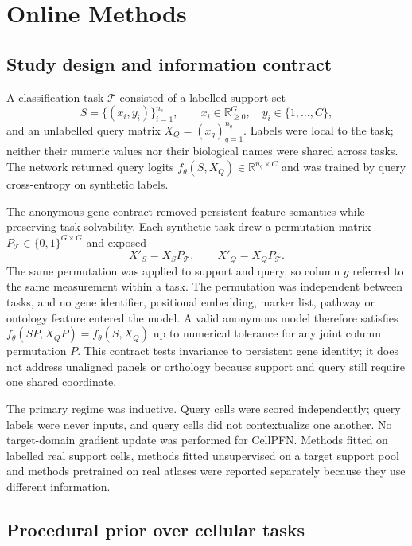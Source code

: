 \documentclass[12pt]{article}
\begin{document}
\section*{Online Methods}

\subsection*{Study design and information contract}

A classification task $\mathcal{T}$ consisted of a labelled support set
\begin{equation}
S=\{(x_i,y_i)\}_{i=1}^{n_s},\qquad x_i\in\mathbb{R}_{\geq0}^{G},\quad y_i\in\{1,\ldots,C\},
\end{equation}
and an unlabelled query matrix $X_Q=(x_q)_{q=1}^{n_q}$. Labels were local to the task; neither their numeric values nor their biological names were shared across tasks. The network returned query logits $f_\theta(S,X_Q)\in\mathbb{R}^{n_q\times C}$ and was trained by query cross-entropy on synthetic labels.

The anonymous-gene contract removed persistent feature semantics while preserving task solvability. Each synthetic task drew a permutation matrix $P_\mathcal{T}\in\{0,1\}^{G\times G}$ and exposed
\begin{equation}
X'_S=X_SP_\mathcal{T},\qquad X'_Q=X_QP_\mathcal{T}.
\end{equation}
The same permutation was applied to support and query, so column $g$ referred to the same measurement within a task. The permutation was independent between tasks, and no gene identifier, positional embedding, marker list, pathway or ontology feature entered the model. A valid anonymous model therefore satisfies $f_\theta(SP, X_QP)=f_\theta(S,X_Q)$ up to numerical tolerance for any joint column permutation $P$. This contract tests invariance to persistent gene identity; it does not address unaligned panels or orthology because support and query still require one shared coordinate.

The primary regime was inductive. Query cells were scored independently; query labels were never inputs, and query cells did not contextualize one another. No target-domain gradient update was performed for CellPFN. Methods fitted on labelled real support cells, methods fitted unsupervised on a target support pool and methods pretrained on real atlases were reported separately because they use different information.

\subsection*{Procedural prior over cellular tasks}
\end{document}
